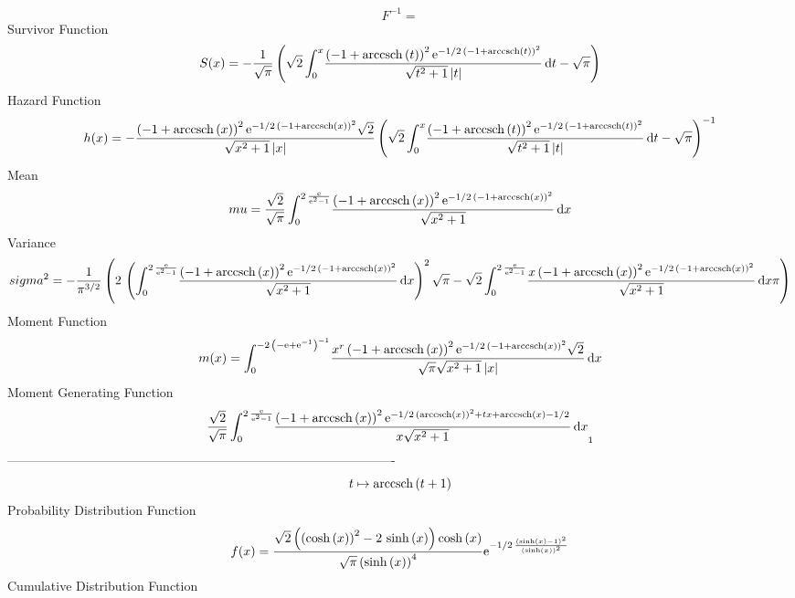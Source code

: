 \documentclass[12pt]{article}
\begin{document}
  $$F^{-1} = $$Survivor Function 
 $$ S(x)=-{\frac {1}{\sqrt {\pi}} \left( \sqrt {2}\int_{0}^{x}\!{\frac {
 \left( -1+{\rm arccsch} \left(t\right) \right) ^{2}{{\rm e}^{-1/2\,
 \left( -1+{\rm arccsch} \left(t\right) \right) ^{2}}}}{\sqrt {{t}^{2}
+1} \left| t \right| }}\,{\rm d}t-\sqrt {\pi} \right) }
$$ Hazard Function 
 $$ h(x)=-{\frac { \left( -1+{\rm arccsch} \left(x\right) \right) ^{2}{{\rm e}^
{-1/2\, \left( -1+{\rm arccsch} \left(x\right) \right) ^{2}}}\sqrt {2}
}{\sqrt {{x}^{2}+1} \left| x \right| } \left( \sqrt {2}\int_{0}^{x}\!{
\frac { \left( -1+{\rm arccsch} \left(t\right) \right) ^{2}{{\rm e}^{-
1/2\, \left( -1+{\rm arccsch} \left(t\right) \right) ^{2}}}}{\sqrt {{t
}^{2}+1} \left| t \right| }}\,{\rm d}t-\sqrt {\pi} \right) ^{-1}}
$$Mean 
 $$ mu={\frac {\sqrt {2}}{\sqrt {\pi}}\int_{0}^{2\,{\frac {{\rm e}}{{{\rm e}^
{2}}-1}}}\!{\frac { \left( -1+{\rm arccsch} \left(x\right) \right) ^{2
}{{\rm e}^{-1/2\, \left( -1+{\rm arccsch} \left(x\right) \right) ^{2}}
}}{\sqrt {{x}^{2}+1}}}\,{\rm d}x}
$$ Variance 
 $$ sigma^2 = -{\frac {1}{{\pi}^{3/2}} \left( 2\, \left( \int_{0}^{2\,{\frac {{\rm e
}}{{{\rm e}^{2}}-1}}}\!{\frac { \left( -1+{\rm arccsch} \left(x\right)
 \right) ^{2}{{\rm e}^{-1/2\, \left( -1+{\rm arccsch} \left(x\right)
 \right) ^{2}}}}{\sqrt {{x}^{2}+1}}}\,{\rm d}x \right) ^{2}\sqrt {\pi}
-\sqrt {2}\int_{0}^{2\,{\frac {{\rm e}}{{{\rm e}^{2}}-1}}}\!{\frac {x
 \left( -1+{\rm arccsch} \left(x\right) \right) ^{2}{{\rm e}^{-1/2\,
 \left( -1+{\rm arccsch} \left(x\right) \right) ^{2}}}}{\sqrt {{x}^{2}
+1}}}\,{\rm d}x\pi \right) }
$$Moment Function 
 $$ m(x) = \int_{0}^{-2\, \left( -{\rm e}+{{\rm e}^{-1}} \right) ^{-1}}\!{\frac {
{x}^{r} \left( -1+{\rm arccsch} \left(x\right) \right) ^{2}{{\rm e}^{-
1/2\, \left( -1+{\rm arccsch} \left(x\right) \right) ^{2}}}\sqrt {2}}{
\sqrt {\pi}\sqrt {{x}^{2}+1} \left| x \right| }}\,{\rm d}x
$$ Moment Generating Function 
 $${\frac {\sqrt {2}}{\sqrt {\pi}}\int_{0}^{2\,{\frac {{\rm e}}{{{\rm e}^
{2}}-1}}}\!{\frac { \left( -1+{\rm arccsch} \left(x\right) \right) ^{2
}{{\rm e}^{-1/2\, \left( {\rm arccsch} \left(x\right) \right) ^{2}+tx+
{\rm arccsch} \left(x\right)-1/2}}}{x\sqrt {{x}^{2}+1}}}\,{\rm d}x}_{{
1}}
$$-------------------------------------------------------------------------------------------  \\$$t\mapsto {\rm arccsch} \left(t+1\right)
$$Probability Distribution Function 
$$  f(x)={\frac {\sqrt {2} \left(  \left( \cosh \left( x \right)  \right) ^{2}-
2\,\sinh \left( x \right)  \right) \cosh \left( x \right) }{\sqrt {\pi
} \left( \sinh \left( x \right)  \right) ^{4}}{{\rm e}^{-1/2\,{\frac {
 \left( \sinh \left( x \right) -1 \right) ^{2}}{ \left( \sinh \left( x
 \right)  \right) ^{2}}}}}}
$$Cumulative Distribution Function  
\end{document}
